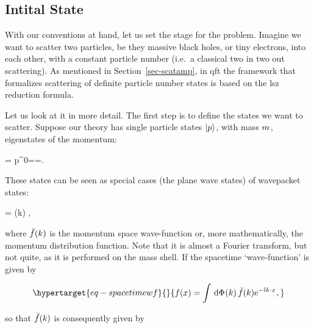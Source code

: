 \documentclass[
  11pt,
  a4paper,
  DIV=11,
  numbers=noendperiod,
  oneside]{scrreprt}
\let\[\relax \let\]\relax %
\DeclareRobustCommand{\[}{\begin{equation}}
\DeclareRobustCommand{\]}{\end{equation}}
\begin{document}
\hypertarget{intital-state}{%
\subsection{Intital State}\label{intital-state}}

With our conventions at hand, let us set the stage for the problem.
Imagine we want to scatter two particles, be they massive black holes,
or tiny electrons, into each other, with a constant particle number
(i.e.~a classical two in two out scattering). As mentioned in
Section~\ref{sec-scatamp}, in \gls{qft} the framework that formalizes
scattering of definite particle number states is based on the \gls{lsz}
reduction formula.

{}

Let us look at it in more detail. The first step is to define the states
we want to scatter. Suppose our theory has single particle states
\(\vert p \rangle_{\text{}}\), with mass \(m_{}\), eigenstates of the momentum:

\[\ct{\momop}\momket=\ct{\emom}\momket \quad {} \quad p^0=\hbar\shellen=.\]

These states can be seen as special cases (the plane wave states) of
wavepacket states:

\[=\int {} (k) \momket[k],\]

where \(\breve{f}(k)\) is the momentum space wave-function or, more
mathematically, the momentum distribution function. Note that it is
almost a Fourier transform, but not quite, as it is performed on the
mass shell. If the spacetime `wave-function'  is given by

\begin{equation}\protect\hypertarget{eq-spacetimewf}{}{f(x)=\int \ddP{k} \shellft{f}(k) \exp{-\im\lv{k}\cdot\lv{x}},}\label{eq-spacetimewf}\end{equation}

so that \(\breve{f}(k)\) is consequently given by
\end{document}
